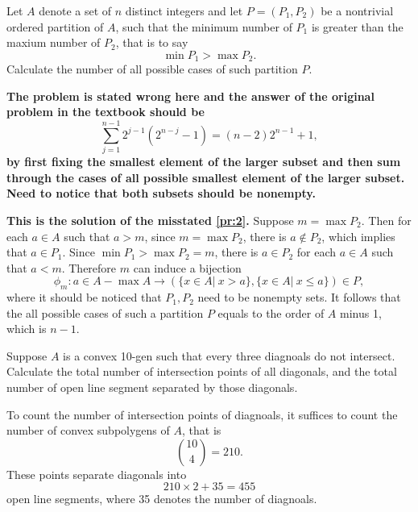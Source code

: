 \documentclass{assignment}[2019/10/15]
\newcommand{\lr}[3]{\left#1#3\right#2}
\begin{document}
    \begin{problem}\label{pr:2}
        Let $A$ denote a set of $n$ distinct integers and let $P = (P_1, P_2)$ be a nontrivial ordered partition of $A$, such that the minimum number of $P_1$ is greater than the maxium number of $P_2$, that is to say
        \begin{equation}
            \min P_1 > \max P_2.
        \end{equation}
        Calculate the number of all possible cases of such partition $P$.
    \end{problem}
    \begin{note}
    {\bf
        The problem is stated wrong here and the answer of the original problem in the textbook should be
        \begin{equation}
            \sum_{j=1}^{n-1}2^{j-1}(2^{n-j}-1) = (n-2)2^{n-1}+1,
        \end{equation}
        by first fixing the smallest element of the larger subset and then sum through the cases of all possible smallest element of the larger subset. Need to notice that both subsets should be nonempty.
    }
    \end{note}
    \begin{solution}
        {\bf This is the solution of the misstated \ref{pr:2}.}
        Suppose $m = \max P_2$. Then for each $a\in A$ such that $a > m$, since $m = \max P_2$, there is $a \notin P_2$, which implies that $a \in P_1$. Since $\min P_1 > \max P_2 = m$, there is $a\in P_2$ for each $a\in A$ such that $a < m$. Therefore $m$ can induce a bijection
        \begin{equation}
            \phi_m : a\in A-\max A \to \lr(){\{x\in A|\ x > a\}, \{x\in A|\ x\leq a\}}\in P,
        \end{equation}
        where it should be noticed that $P_1, P_2$ need to be nonempty sets. It follows that the all possible cases of such a partition $P$ equals to the order of $A$ minus 1, which is $n-1$.
    \end{solution}

    \begin{problem}
        Suppose $A$ is a convex 10-gen such that every three diagnoals do not intersect. Calculate the total number of intersection points of all diagonals, and the total number of open line segment separated by those diagonals.
    \end{problem}
    \begin{solution}
        To count the number of intersection points of diagnoals, it suffices to count the number of convex subpolygens of $A$, that is
        \begin{equation}
            \binom{10}{4} = 210.
        \end{equation}
        These points separate diagonals into
        \begin{equation}
            210\times 2 + 35 = 455
        \end{equation}
        open line segments, where 35 denotes the number of diagnoals.
    \end{solution}
\end{document}
